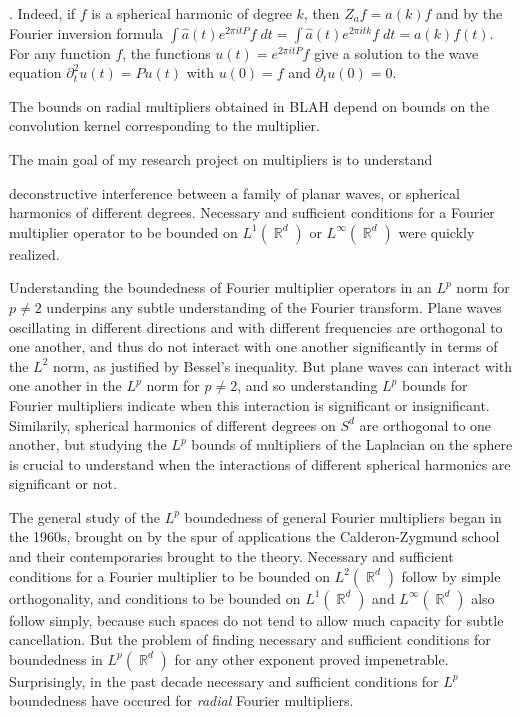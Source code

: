 \documentclass[12pt]{article}
\DeclareMathOperator{\RR}{\mathbb{R}}
\begin{document}
. Indeed, if $f$ is a spherical harmonic of degree $k$, then $Z_a f = a(k) f$ and by the Fourier inversion formula $\int \widehat{a}(t) e^{2 \pi i t P} f\; dt = \int \widehat{a}(t) e^{2 \pi i t k} f\; dt = a(k) f(t)$. For any function $f$, the functions $u(t) = e^{2 \pi i t P} f$ give a solution to the wave equation $\partial_t^2 u(t) = P u(t)$ with $u(0) = f$ and $\partial_t u(0) = 0$.


The bounds on radial multipliers obtained in BLAH depend on bounds on the convolution kernel corresponding to the multiplier. 


The main goal of my research project on multipliers is to understand


 deconstructive interference between a family of planar waves, or spherical harmonics of different degrees. Necessary and sufficient conditions for a Fourier multiplier operator to be bounded on $L^1(\RR^d)$ or $L^\infty(\RR^d)$ were quickly realized.

Understanding the boundedness of Fourier multiplier operators in an $L^p$ norm for $p \neq 2$ underpins any subtle understanding of the Fourier transform. Plane waves oscillating in different directions and with different frequencies are orthogonal to one another, and thus do not interact with one another significantly in terms of the $L^2$ norm, as justified by Bessel's inequality. But plane waves can interact with one another in the $L^p$ norm for $p \neq 2$, and so understanding $L^p$ bounds for Fourier multipliers indicate when this interaction is significant or insignificant. Similarily, spherical harmonics of different degrees on $S^d$ are orthogonal to one another, but studying the $L^p$ bounds of multipliers of the Laplacian on the sphere is crucial to understand when the interactions of different spherical harmonics are significant or not.



The general study of the $L^p$ boundedness of general Fourier multipliers began in the 1960s, brought on by the spur of applications the Calderon-Zygmund school and their contemporaries brought to the theory. Necessary and sufficient conditions for a Fourier multiplier to be bounded on $L^2(\RR^d)$ follow by simple orthogonality, and conditions to be bounded on $L^1(\RR^d)$ and $L^\infty(\RR^d)$ also follow simply, because such spaces do not tend to allow much capacity for subtle cancellation. But the problem of finding necessary and sufficient conditions for boundedness in $L^p(\RR^d)$ for any other exponent proved impenetrable. Surprisingly, in the past decade necessary and sufficient conditions for $L^p$ boundedness have occured for \emph{radial} Fourier multipliers.
\end{document}
